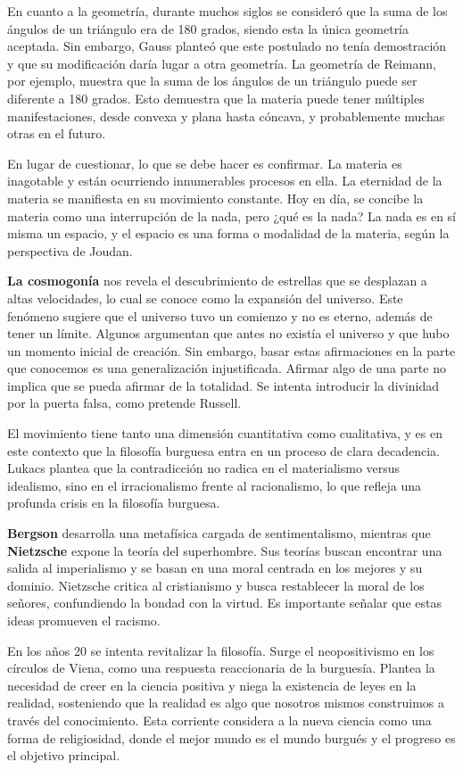 \documentclass[
  letterpaper,
  DIV=11,
  numbers=noendperiod]{scrartcl}
\begin{document}
En cuanto a la geometría, durante muchos siglos se consideró que la suma
de los ángulos de un triángulo era de 180 grados, siendo esta la única
geometría aceptada. Sin embargo, Gauss planteó que este postulado no
tenía demostración y que su modificación daría lugar a otra geometría.
La geometría de Reimann, por ejemplo, muestra que la suma de los ángulos
de un triángulo puede ser diferente a 180 grados. Esto demuestra que la
materia puede tener múltiples manifestaciones, desde convexa y plana
hasta cóncava, y probablemente muchas otras en el futuro.

En lugar de cuestionar, lo que se debe hacer es confirmar. La materia es
inagotable y están ocurriendo innumerables procesos en ella. La
eternidad de la materia se manifiesta en su movimiento constante. Hoy en
día, se concibe la materia como una interrupción de la nada, pero ¿qué
es la nada? La nada es en sí misma un espacio, y el espacio es una forma
o modalidad de la materia, según la perspectiva de Joudan.

\textbf{La cosmogonía} nos revela el descubrimiento de estrellas que se
desplazan a altas velocidades, lo cual se conoce como la expansión del
universo. Este fenómeno sugiere que el universo tuvo un comienzo y no es
eterno, además de tener un límite. Algunos argumentan que antes no
existía el universo y que hubo un momento inicial de creación. Sin
embargo, basar estas afirmaciones en la parte que conocemos es una
generalización injustificada. Afirmar algo de una parte no implica que
se pueda afirmar de la totalidad. Se intenta introducir la divinidad por
la puerta falsa, como pretende Russell.

El movimiento tiene tanto una dimensión cuantitativa como cualitativa, y
es en este contexto que la filosofía burguesa entra en un proceso de
clara decadencia. Lukacs plantea que la contradicción no radica en el
materialismo versus idealismo, sino en el irracionalismo frente al
racionalismo, lo que refleja una profunda crisis en la filosofía
burguesa.

\textbf{Bergson} desarrolla una metafísica cargada de sentimentalismo,
mientras que \textbf{Nietzsche} expone la teoría del superhombre. Sus
teorías buscan encontrar una salida al imperialismo y se basan en una
moral centrada en los mejores y su dominio. Nietzsche critica al
cristianismo y busca restablecer la moral de los señores, confundiendo
la bondad con la virtud. Es importante señalar que estas ideas promueven
el racismo.

En los años 20 se intenta revitalizar la filosofía. Surge el
neopositivismo en los círculos de Viena, como una respuesta reaccionaria
de la burguesía. Plantea la necesidad de creer en la ciencia positiva y
niega la existencia de leyes en la realidad, sosteniendo que la realidad
es algo que nosotros mismos construimos a través del conocimiento. Esta
corriente considera a la nueva ciencia como una forma de religiosidad,
donde el mejor mundo es el mundo burgués y el progreso es el objetivo
principal.
\end{document}
